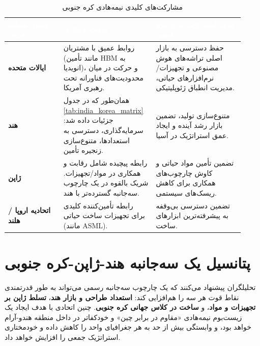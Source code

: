 \documentclass[10pt]{report}
\begin{document}
\begin{table}[H]
    \centering
    \caption{مشارکت‌های کلیدی نیمه‌هادی کره جنوبی}
    \label{tab:korea_partners}
    \begin{tabular}{P{0.22\linewidth} P{0.35\linewidth} P{0.35\linewidth}}
        \toprule
        \textcolor{white}{\textbf{کشور/منطقه شریک}} & \textcolor{white}{\textbf{ماهیت همکاری}} & \textcolor{white}{\textbf{هدف استراتژیک برای کره جنوبی}} \\
        \midrule
        \textbf{ایالات متحده} & روابط عمیق با مشتریان (مانند تأمین HBM به انویدیا)، و حرکت در میان محدودیت‌های فناورانه تحت رهبری آمریکا. & حفظ دسترسی به بازار اصلی تراشه‌های هوش مصنوعی و تجهیزات/نرم‌افزارهای حیاتی، مدیریت انطباق ژئوپلیتیکی. \\
        \textbf{هند} & همان‌طور که در جدول \ref{tab:india_korea_matrix} جزئیات داده شد: سرمایه‌گذاری، دسترسی به استعدادها، متنوع‌سازی زنجیره تأمین. & متنوع‌سازی تولید، تضمین بازار رشد آینده و ایجاد عمق استراتژیک در آسیا. \\
        \textbf{ژاپن} & رابطه پیچیده شامل رقابت و همکاری در مواد/تجهیزات. شریک بالقوه در یک چارچوب سه‌جانبه گسترده‌تر با هند. & تضمین تأمین مواد حیاتی و کاوش چارچوب‌های همکاری برای کاهش ریسک‌های سیستمی. \\
        \textbf{اتحادیه اروپا / هلند} & رابطه تأمین‌کننده کلیدی برای تجهیزات ساخت حیاتی (مانند ASML). & تضمین دسترسی بی‌وقفه به پیشرفته‌ترین ابزارهای ساخت. \\
        \bottomrule
    \end{tabular}
\end{table}

\section{پتانسیل یک سه‌جانبه هند-ژاپن-کره جنوبی}
\begin{keyconceptbox}
تحلیلگران پیشنهاد می‌کنند که یک چارچوب سه‌جانبه رسمی می‌تواند به طور قدرتمندی نقاط قوت هر سه را هم‌افزایی کند: \textbf{استعداد طراحی و بازار هند}، \textbf{تسلط ژاپن بر تجهیزات و مواد}، و \textbf{ساخت در کلاس جهانی کره جنوبی}. چنین اتحادی با هدف ایجاد یک زیست‌بوم نیمه‌هادی «مقاوم در برابر چین» و خودکفاتر در داخل منطقه هندو-آرام خواهد بود، و وابستگی بیش از حد به هر جغرافیای واحد را کاهش داده و خودمختاری استراتژیک جمعی را افزایش خواهد داد.
\end{keyconceptbox}
\end{document}
